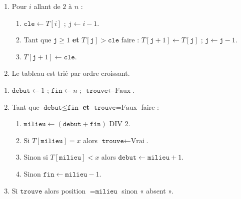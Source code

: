 \documentclass[11pt]{article}
\begin{document}
\begin{methode}
\begin{enumerate}
\item Pour $i$ allant de $2$ à $n$ :
      \begin{enumerate}
      \item $\texttt{cle} \leftarrow T[i]$ ; $\texttt{j} \leftarrow i-1$.
      \item Tant que $\texttt{j} \ge 1$ \textbf{et} $T[\texttt{j}] > \texttt{cle}$ faire :
            $T[\texttt{j}+1] \leftarrow T[\texttt{j}]$ ; $\texttt{j} \leftarrow \texttt{j} - 1$.
      \item $T[\texttt{j}+1] \leftarrow \texttt{cle}$.
      \end{enumerate}
\item Le tableau est trié par ordre croissant.
\end{enumerate}
\end{methode}

\begin{methode}
\begin{enumerate}
\item $\texttt{debut} \leftarrow 1$ ; $\texttt{fin} \leftarrow n$ ; $\texttt{trouve} \leftarrow \text{Faux}$.
\item Tant que $\texttt{debut} \le \texttt{fin}$ \textbf{et} $\texttt{trouve} = \text{Faux}$ faire :
      \begin{enumerate}
      \item $\texttt{milieu} \leftarrow (\texttt{debut} + \texttt{fin}) \text{ DIV } 2$.
      \item Si $T[\texttt{milieu}] = x$ alors $\texttt{trouve} \leftarrow \text{Vrai}$.
      \item Sinon si $T[\texttt{milieu}] < x$ alors $\texttt{debut} \leftarrow \texttt{milieu} + 1$.
      \item Sinon $\texttt{fin} \leftarrow \texttt{milieu} - 1$.
      \end{enumerate}
\item Si $\texttt{trouve}$ alors position $= \texttt{milieu}$ sinon « absent ».
\end{enumerate}
\end{methode}
\end{document}
